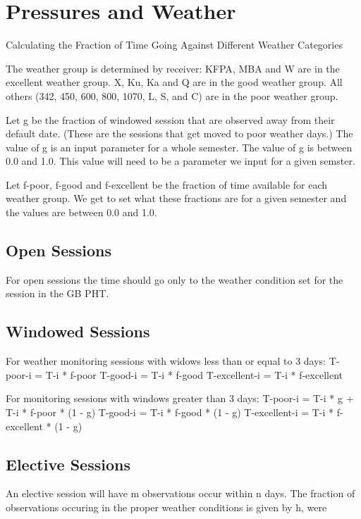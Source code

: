 \documentclass{article}
\begin{document}
\section{Pressures and Weather}


Calculating the Fraction of Time Going Against Different Weather Categories

The weather group is determined by receiver: KFPA, MBA and W are in the excellent weather group. X, Ku, Ka and Q are in the good weather group. All others (342, 450, 600, 800, 1070, L, S, and C) are in the poor weather group.

Let g be the fraction of windowed session that are observed away from their default date. (These are the sessions that get moved to poor weather days.) The value of g is an input parameter for a whole semester. The value of g is between 0.0 and 1.0. This value will need to be a parameter we input for a given semster.

Let f-poor, f-good and f-excellent be the fraction of time available for each weather group. We get to set what these fractions are for a given semester and the values are between 0.0 and 1.0. 
\subsection{Open Sessions}

For open sessions the time should go only to the weather condition set for the session in the GB PHT.

\subsection{Windowed Sessions}

For weather monitoring sessions with widows less than or equal to 3 days: T-poor-i = T-i * f-poor T-good-i = T-i * f-good T-excellent-i = T-i * f-excellent

For monitoring sessions with windows greater than 3 days: T-poor-i = T-i * g + T-i * f-poor * (1 - g) T-good-i = T-i * f-good * (1 - g) T-excellent-i = T-i * f-excellent * (1 - g) 

\subsection{Elective Sessions}

An elective session will have m observations occur within n days. The fraction of observations occuring in the proper weather conditions is given by h, were
\end{document}
